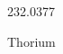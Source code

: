 \documentclass[12pt]{article}
\begin{document}
\hfill{}
\vfill
\begin{center}
  {\fontsize{50}{60}
  }

  232.0377

Thorium
\end{center}
\vfill
\end{document}

